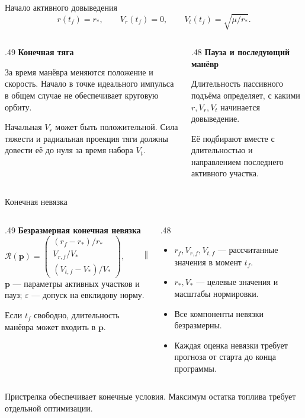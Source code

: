 \documentclass[11pt,aspectratio=169,t]{beamer}
\newcommand{\eqcompact}{\fontsize{10}{12}\selectfont}
\newcommand{\derivationmathspacing}{%
  \setlength{\abovedisplayskip}{2pt}%
  \setlength{\belowdisplayskip}{3pt}%
  \setlength{\abovedisplayshortskip}{2pt}%
  \setlength{\belowdisplayshortskip}{2pt}%
  \setlength{\jot}{2pt}}
\newcommand{\vect}[1]{\boldsymbol{#1}}
\newcommand{\norm}[1]{\left\lVert#1\right\rVert}
\begin{document}
\begin{frame}{Начало активного довыведения}
\relax\derivationmathspacing
{\eqcompact
\[
 r(t_f)=r_*,\qquad V_r(t_f)=0,\qquad V_t(t_f)=\sqrt{\mu/r_*}.
\]
}
\begin{columns}[T,onlytextwidth]
\begin{column}{.49\textwidth}
\textbf{Конечная тяга}
\par\smallskip
За время манёвра меняются положение и скорость.
Начало в точке идеального импульса в общем случае
не обеспечивает круговую орбиту.
\par\smallskip
Начальная $V_r$ может быть положительной.
Сила тяжести и радиальная проекция тяги должны довести её до нуля
за время набора $V_t$.
\end{column}
\begin{column}{.48\textwidth}
\textbf{Пауза и последующий манёвр}
\par\smallskip
Длительность пассивного подъёма определяет,
с какими $r,V_r,V_t$ начинается довыведение.
\par\smallskip
Её подбирают вместе с длительностью
и направлением последнего активного участка.
\end{column}
\end{columns}
\end{frame}

\begin{frame}{Конечная невязка}
\relax\derivationmathspacing
\begin{columns}[T,onlytextwidth]
\begin{column}{.49\textwidth}
\textbf{Безразмерная конечная невязка}
{\eqcompact
\[
 \vect{\mathcal R}(\vect p)=
 \begin{pmatrix}
 (r_f-r_*)/r_*\\
 V_{r,f}/V_*\\
 (V_{t,f}-V_*)/V_*
 \end{pmatrix},\qquad
 \norm{\vect{\mathcal R}}_2\le\varepsilon.
\]
}
$\vect p$ --- параметры активных участков и пауз;
$\varepsilon$ --- допуск на евклидову норму.
\par\smallskip
Если $t_f$ свободно, длительность манёвра может входить в $\vect p$.
\end{column}
\begin{column}{.48\textwidth}
\begin{itemize}
\setlength{\itemsep}{4pt}
 \item $r_f,V_{r,f},V_{t,f}$ --- рассчитанные значения в момент $t_f$.
 \item $r_*,V_*$ --- целевые значения и масштабы нормировки.
 \item Все компоненты невязки безразмерны.
 \item Каждая оценка невязки требует прогноза от старта до конца программы.
\end{itemize}
\end{column}
\end{columns}
\smallskip
Пристрелка обеспечивает конечные условия. Максимум остатка топлива требует отдельной оптимизации.
\end{frame}
\end{document}
